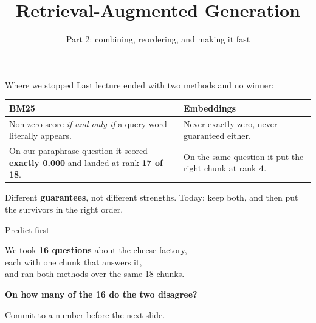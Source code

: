 \documentclass[aspectratio=169]{beamer}
\title{Retrieval-Augmented Generation}
\subtitle{Part 2: combining, reordering, and making it fast}
\author{}
\date{}
\newcommand{\keybox}[1]{%
  \begin{tcolorbox}[colback=armblue!8, colframe=armblue, boxrule=0.6pt, arc=2pt]
  #1
  \end{tcolorbox}}
\begin{document}
\begin{frame}[plain]
  \titlepage
\end{frame}

\begin{frame}{Where we stopped}
  \vspace{0.4em}
  Last lecture ended with two methods and no winner:

  \vspace{0.8em}
  \begin{center}
  \small
  \begin{tabular}{p{}p{}}
    \toprule
    \textbf{BM25} & \textbf{Embeddings} \\
    \midrule
    Non-zero score \emph{if and only if} a query word literally appears.
    &
    Never exactly zero, never guaranteed either. \\[0.4em]
    On our paraphrase question it scored \textbf{\color{armred}exactly 0.000} and
    landed at rank \textbf{17 of 18}.
    &
    On the same question it put the right chunk at rank \textbf{4}. \\
    \bottomrule
  \end{tabular}
  \end{center}

  \vspace{1.0em}
  \keybox{Different \textbf{guarantees}, not different strengths. Today: keep both, and
  then put the survivors in the right order.}
\end{frame}

\begin{frame}{Predict first}
  \vspace{1.0em}
  \begin{center}
    {\large We took \textbf{16 questions} about the cheese factory,}\\[0.3em]
    {\large each with one chunk that answers it,}\\[0.3em]
    {\large and ran both methods over the same 18 chunks.}
  \end{center}

  \vspace{1.4em}
  \begin{center}
    {\Large\color{popblue}\textbf{On how many of the 16 do the two disagree?}}
  \end{center}

  \vspace{1.2em}
  \begin{center}
  {\small\color{gray}Commit to a number before the next slide.}
  \end{center}
\end{frame}
\end{document}
